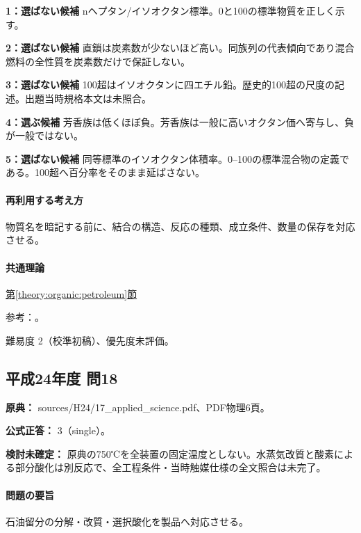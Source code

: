 \noindent\textbf{1：選ばない候補} nヘプタン/イソオクタン標準。0と100の標準物質を正しく示す。\par

\noindent\textbf{2：選ばない候補} 直鎖は炭素数が少ないほど高い。同族列の代表傾向であり混合燃料の全性質を炭素数だけで保証しない。\par

\noindent\textbf{3：選ばない候補} 100超はイソオクタンに四エチル鉛。歴史的100超の尺度の記述。出題当時規格本文は未照合。\par

\noindent\textbf{4：選ぶ候補} 芳香族は低くほぼ負。芳香族は一般に高いオクタン価へ寄与し、負が一般ではない。\par

\noindent\textbf{5：選ばない候補} 同等標準のイソオクタン体積率。0–100の標準混合物の定義である。100超へ百分率をそのまま延ばさない。\par

\paragraph{再利用する考え方} 物質名を暗記する前に、結合の構造、反応の種類、成立条件、数量の保存を対応させる。

\paragraph{共通理論} \hyperref[theory:organic:petroleum]{第\ref*{theory:organic:petroleum}節}

\par 参考：\cite{organic_gasoline}。

\par 難易度 2（校準初稿）、優先度未評価。

\subsection{平成24年度 問18}
\label{q:h24-reg-applied-18}

\noindent\textbf{原典：} sources/H24/17\_applied\_science.pdf、PDF物理6頁。

\textbf{公式正答：} 3（single）。

\par\textbf{検討未確定：} 原典の750℃を全装置の固定温度としない。水蒸気改質と酸素による部分酸化は別反応で、全工程条件・当時触媒仕様の全文照合は未完了。

\paragraph{問題の要旨} 石油留分の分解・改質・選択酸化を製品へ対応させる。

